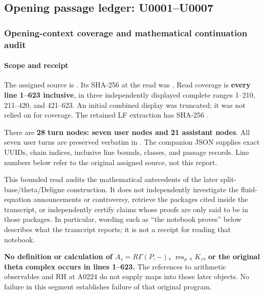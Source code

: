 \subsection{Opening passage ledger:
U0001--U0007}\label{opening-passage-ledger-u0001u0007}

\subsubsection{Opening-context coverage and mathematical continuation
audit}\label{opening-context-coverage-and-mathematical-continuation-audit}

\paragraph{Scope and receipt}\label{scope-and-receipt}

The assigned source is
\protect{}.
Its SHA-256 at the read was
\protect{}.
Read coverage is \textbf{every line 1--623 inclusive}, in three
independently displayed complete ranges 1--210, 211--420, and 421--623.
An initial combined display was truncated; it was not relied on for
coverage. The retained LF extraction
\protect{} has SHA-256
\protect{}.

There are \textbf{28 turn nodes: seven user nodes and 21 assistant
nodes}. All seven user turns are preserved verbatim in
\protect{}. The companion JSON supplies
exact UUIDs, chain indices, inclusive line bounds, classes, and passage
records. Line numbers below refer to the original assigned source, not
this report.

This bounded read audits the mathematical antecedents of the later
split-base/theta/Deligne construction. It does not independently
investigate the fluid-equation announcements or controversy, retrieve
the packages cited inside the transcript, or independently certify
claims whose proofs are only said to be in those packages. In
particular, wording such as ``the notebook proves'' below describes what
the transcript reports; it is not a receipt for reading that notebook.

\textbf{No definition or calculation of \(A_\tau=R\Gamma(P,-)\),
\(\operatorname{res}_\sigma\), \(K_\tau\), or the original theta complex
occurs in lines 1--623.} The references to arithmetic observables and RH
at A0224 do not supply maps into those later objects. No failure in this
segment establishes failure of that original program.

